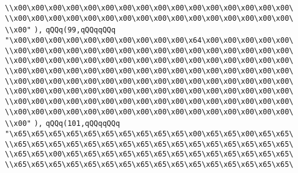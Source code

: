 \verb|\\x00\x00\x00\x00\x00\x00\x00\x00\x00\x00\x00\x00\x00\x00\x00\x00\|\newline
\verb|\\x00\x00\x00\x00\x00\x00\x00\x00\x00\x00\x00\x00\x00\x00\x00\x00\|\newline
\verb|\\x00"|\newline
\verb|),|\newline
\verb|qQQq(99,qQQqqQQq|\newline
\verb|"\x00\x00\x00\x00\x00\x00\x00\x00\x00\x00\x64\x00\x00\x00\x00\x00\|\newline
\verb|\\x00\x00\x00\x00\x00\x00\x00\x00\x00\x00\x00\x00\x00\x00\x00\x00\|\newline
\verb|\\x00\x00\x00\x00\x00\x00\x00\x00\x00\x00\x00\x00\x00\x00\x00\x00\|\newline
\verb|\\x00\x00\x00\x00\x00\x00\x00\x00\x00\x00\x00\x00\x00\x00\x00\x00\|\newline
\verb|\\x00\x00\x00\x00\x00\x00\x00\x00\x00\x00\x00\x00\x00\x00\x00\x00\|\newline
\verb|\\x00\x00\x00\x00\x00\x00\x00\x00\x00\x00\x00\x00\x00\x00\x00\x00\|\newline
\verb|\\x00\x00\x00\x00\x00\x00\x00\x00\x00\x00\x00\x00\x00\x00\x00\x00\|\newline
\verb|\\x00\x00\x00\x00\x00\x00\x00\x00\x00\x00\x00\x00\x00\x00\x00\x00\|\newline
\verb|\\x00"|\newline
\verb|),|\newline
\verb|qQQq(101,qQQqqQQq|\newline
\verb|"\x65\x65\x65\x65\x65\x65\x65\x65\x65\x65\x00\x65\x65\x00\x65\x65\|\newline
\verb|\\x65\x65\x65\x65\x65\x65\x65\x65\x65\x65\x65\x65\x65\x65\x65\x65\|\newline
\verb|\\x65\x65\x00\x65\x65\x65\x65\x65\x65\x65\x65\x65\x65\x65\x65\x65\|\newline
\verb|\\x65\x65\x65\x65\x65\x65\x65\x65\x65\x65\x65\x65\x65\x65\x65\x65\|\newline

